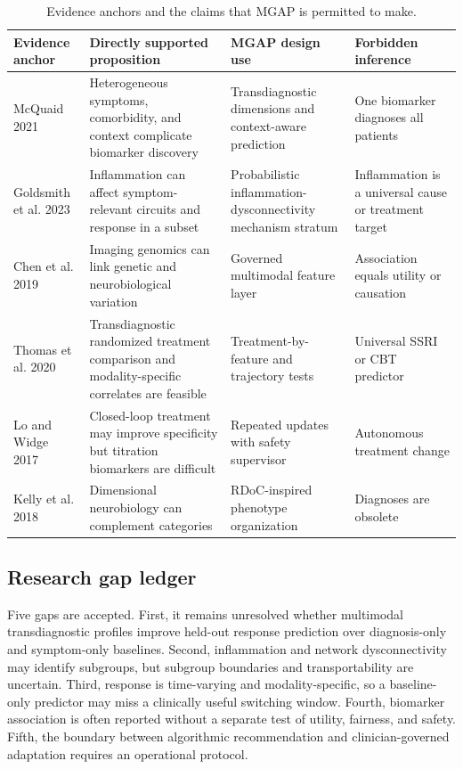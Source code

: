 \documentclass[conference]{IEEEtran}
\begin{document}
\begin{table}[t]
\centering
\caption{Evidence anchors and the claims that MGAP is permitted to make.}
\label{tab:evidence}
\small
\begin{tabular}{p{2.5cm}p{4.0cm}p{4.5cm}p{3.5cm}}
\toprule
Evidence anchor & Directly supported proposition & MGAP design use & Forbidden inference \\
\midrule
McQuaid 2021~\cite{mcquaid2021} & Heterogeneous symptoms, comorbidity, and context complicate biomarker discovery & Transdiagnostic dimensions and context-aware prediction & One biomarker diagnoses all patients \\
Goldsmith et al. 2023~\cite{goldsmith2023} & Inflammation can affect symptom-relevant circuits and response in a subset & Probabilistic inflammation-dysconnectivity mechanism stratum & Inflammation is a universal cause or treatment target \\
Chen et al. 2019~\cite{chen2019} & Imaging genomics can link genetic and neurobiological variation & Governed multimodal feature layer & Association equals utility or causation \\
Thomas et al. 2020~\cite{thomas2020} & Transdiagnostic randomized treatment comparison and modality-specific correlates are feasible & Treatment-by-feature and trajectory tests & Universal SSRI or CBT predictor \\
Lo and Widge 2017~\cite{lo2017} & Closed-loop treatment may improve specificity but titration biomarkers are difficult & Repeated updates with safety supervisor & Autonomous treatment change \\
Kelly et al. 2018~\cite{kelly2018} & Dimensional neurobiology can complement categories & RDoC-inspired phenotype organization & Diagnoses are obsolete \\
\bottomrule
\end{tabular}
\end{table}

\subsection{Research gap ledger}
Five gaps are accepted. First, it remains unresolved whether multimodal transdiagnostic profiles improve held-out response prediction over diagnosis-only and symptom-only baselines. Second, inflammation and network dysconnectivity may identify subgroups, but subgroup boundaries and transportability are uncertain. Third, response is time-varying and modality-specific, so a baseline-only predictor may miss a clinically useful switching window. Fourth, biomarker association is often reported without a separate test of utility, fairness, and safety. Fifth, the boundary between algorithmic recommendation and clinician-governed adaptation requires an operational protocol.
\end{document}
